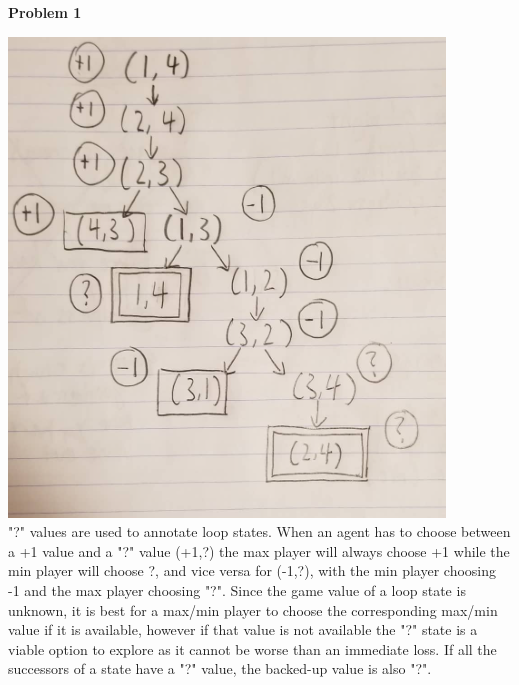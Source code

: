 \documentclass[11pt]{article}
\begin{document}
    \begin{center}
        \Large
        \textbf{Problem 1}
    \end{center}
    \normalsize
    \includegraphics[width=\linewidth]{images/game_tree} \\
    "?" values are used to annotate loop states.
    When an agent has to choose between a +1 value and a "?" value (+1,?)
    the max player will always choose +1 while the min player will choose ?,
    and vice versa for (-1,?), with the min player choosing -1 and the max player choosing "?".
    Since the game value of a loop state is unknown, it is best for a max/min player to choose
    the corresponding max/min value if it is available, however if that value is not
    available the "?" state is a viable option to explore as it cannot be worse than an immediate loss.
    If all the successors of a state have a "?" value, the backed-up value is also "?".
\end{document}
